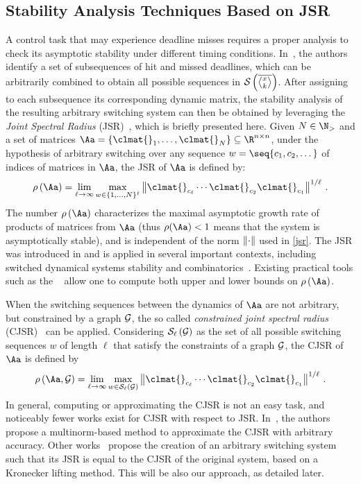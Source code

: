 \subsection{Stability Analysis Techniques Based on JSR}
\label{sec:existing}
A control task that may experience deadline misses requires a proper analysis to check its asymptotic stability under different timing conditions. 
In~\cite{Maggio:2020}, the authors identify a set of subsequences of hit and missed deadlines, which can be arbitrarily combined to obtain all possible sequences in $\sset{}{\rowmiss{}}$.
After assigning to each subsequence its corresponding dynamic matrix, the stability analysis of the resulting arbitrary switching system can then be obtained by leveraging the \emph{Joint Spectral Radius} (JSR)~\cite{Jungers2009}, which is briefly presented here.
%
Given $N\in\N_{>}$ and a set of matrices $\Aa = \{\clmat{}_1, \ldots, \clmat{}_N \} \subseteq \R^{n\times n}$, under the hypothesis of arbitrary switching over any sequence $w=\seq{c_1,c_2,\dots}$ of indices of matrices in $\Aa$, the JSR of $\Aa$ is defined by:
\begin{equation}
    \label{jsr}
    \rho\left(\Aa\right)= \lim_{\ell\rightarrow\infty} \max_{w\in\{1,\ldots,N\}^\ell} \norm{\clmat{}_{c_\ell} \cdots \clmat{}_{c_2}\clmat{}_{c_1}}^{1/\ell} \,.
\end{equation}
The number $\rho\left(\Aa\right)$ characterizes the maximal asymptotic growth rate of products of matrices from $\Aa$ (thus  $\rho(\Aa)<1$ means that the system is asymptotically stable), and is independent of the norm $\left\lVert\cdot\right\rVert$ used in \eqref{jsr}.
%
The JSR was introduced in \cite{rota} and is applied in several important contexts, including switched dynamical systems stability and combinatorics~\cite{Jungers2009}.
Existing practical tools such as the ~\cite{vankeerberghen2014jsr} allow one to compute both upper and lower bounds on $\rho\left(\Aa\right)$.

When the switching sequences between the dynamics of $\Aa$ are not arbitrary, but constrained by a graph $\mathcal{G}_{}$, the so called \emph{constrained joint spectral radius} (CJSR)~\cite{dai2012gelfand} can be applied.
Considering $\mathcal{S}_{\ell}\left( \mathcal{G}_{} \right)$ as the set of all possible switching sequences $w$ of length $\ell$ that satisfy the constraints of a graph $\mathcal{G}_{}$, the CJSR of $\Aa$ is defined by
\begin{equation}
\label{cjsr}
    \rho\left(\Aa,\GG{}\right)= \lim_{\ell\rightarrow\infty} \max_{w\in\sset{\ell}{\GG{}}} \norm{\clmat{}_{c_\ell} \cdots \clmat{}_{c_2}\clmat{}_{c_1}}^{1/\ell} \,.
\end{equation}
In general, computing or approximating the CJSR is not an easy task, and noticeably fewer works exist for CJSR with respect to JSR.
In~\cite{philippe2016stability}, the authors propose a multinorm-based method to approximate the CJSR with arbitrary accuracy.
Other works~\cite{kozyakin2014berger, wang2014stability, xu2020approximation} propose the creation of an arbitrary switching system such that its JSR is equal to the CJSR of the original system, based on a Kronecker lifting method.
This will be also our approach, as detailed later.

